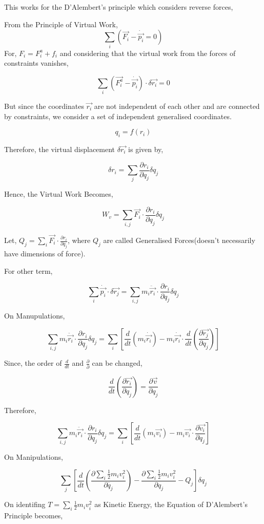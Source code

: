 \documentclass[a4paper]{article}
\newcommand{\ddt}{\frac{d}{dt}}
\newcommand{\pdt}[2]{\frac{\partial #1}{\partial #2}}
\newcommand{\half}{\frac{1}{2}}
\begin{document}
			This works for the D'Alembert's principle which considers reverse forces,

			From the Principle of Virtual Work,
				$$ \sum_i ( \vec{F_i} - \dot{\vec{p_i}} = 0 ) $$
			For, $F_i = F_i^a + f_i$ and considering that the virtual work from the forces of constraints vanishes, 

			$$ \sum_i(\vec{F_i^a} - \dot{\vec{p_i}}) \cdot \delta \vec{r_i} = 0 $$
			
			But since the coordinates $\vec{r_i}$ are not independent of each other and are connected by constraints, we consider a set of independent generalised coordinates.

			$$ q_i = f(r_i) $$

			Therefore, the virtual displacement $\delta \vec{r_i}$ is given by,

			$$ \delta r_i = \sum_j \pdt{r_i}{q_j}\delta q_j $$

			Hence, the Virtual Work Becomes,

			$$ W_v = \sum_{i,j} \vec{F_i} \cdot \pdt{r_i}{q_j}\delta q_j $$

			Let, $Q_j = \sum_i \vec{F_i} \cdot \pdt{r_i}{q_j}$, where $Q_j$ are called Generalised Forces(doesn't necessarily have dimensions of force).

			For other term,

			$$ \sum_i \dot{\vec{p_i}} \cdot \delta \vec{r_j}  = \sum_{i,j} m_i \ddot{\vec{r_i}} \cdot \pdt{r_i}{q_j} \delta q_j $$

			On Manupulations,

			$$ \sum_{i,j} m_i \ddot{\vec{r_i}} \cdot \pdt{r_i}{q_j} \delta q_j = \sum_i[ \ddt (m_i \dot{\vec{r_i}}) - m_i \dot{\vec{r_i}} \cdot \ddt(\pdt{\vec{r_j}}{q_j})] $$
			
			Since, the order of $\ddt$ and $\pdt{}{}$ can be changed,

			$$ \ddt(\pdt{\vec{r_i}}{q_j}) = \pdt{\vec{v}}{q_j} $$

			Therefore,

			$$ \sum_{i,j} m_i \ddot{\vec{r_i}} \cdot \pdt{r_i}{q_j} \delta q_j = \sum_i[ \ddt (m_i \vec{v_i}) - m_i \vec{v_i} \cdot \pdt{\vec{v_i}}{q_j}] $$

			On Manipulations, 

			$$ \sum_j [ \ddt(\pdt{\sum_i \half m_i v_i^2}{\dot{q_j}})  - \pdt{\sum_i \half m_i v_i^2}{q_j} - Q_j]\delta q_j $$

			On identifing $T = \sum_i \half m_i v_i^2$ as Kinetic Energy, the Equation of D'Alembert's Principle becomes,
\end{document}
